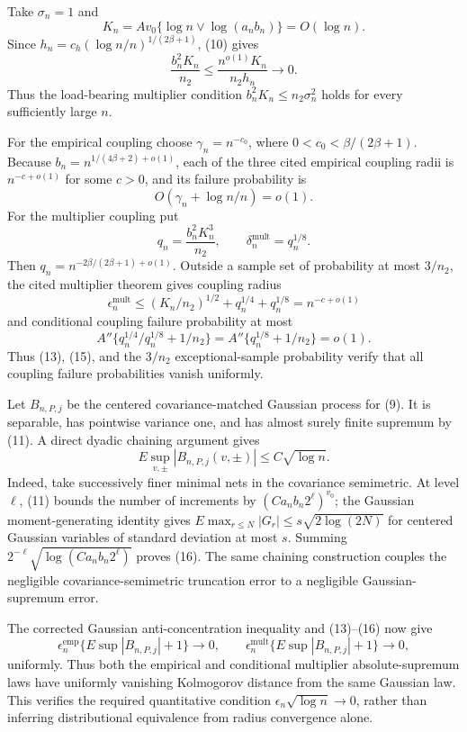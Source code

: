 Take \(\sigma_n=1\) and
\[
 K_n=Av_0\{\log n\vee\log(a_nb_n)\}=O(\log n).
\]
Since \(h_n=c_h(\log n/n)^{1/(2\beta+1)}\), (10) gives
\[
 \frac{b_n^2K_n}{n_2}
 \le\frac{n^{o(1)}K_n}{n_2h_n}\longrightarrow0. \tag{12}
\]
Thus the load-bearing multiplier condition \(b_n^2K_n\le n_2\sigma_n^2\) holds for every sufficiently large \(n\).

For the empirical coupling choose \(\gamma_n=n^{-c_0}\), where
\(0<c_0<\beta/(2\beta+1)\).  Because
\(b_n=n^{1/(4\beta+2)+o(1)}\), each of the three cited empirical coupling radii is \(n^{-c+o(1)}\) for some \(c>0\), and its failure probability is
\[
 O(\gamma_n+\log n/n)=o(1). \tag{13}
\]
For the multiplier coupling put
\[
 q_n=\frac{b_n^2K_n^3}{n_2},
 \qquad \delta_n^{\mathrm{mult}}=q_n^{1/8}.
\]
Then \(q_n=n^{-2\beta/(2\beta+1)+o(1)}\).  Outside a sample set of probability at most \(3/n_2\), the cited multiplier theorem gives coupling radius
\[
 \epsilon_n^{\mathrm{mult}}
 \le (K_n/n_2)^{1/2}+q_n^{1/4}+q_n^{1/8}
 =n^{-c+o(1)} \tag{14}
\]
and conditional coupling failure probability at most
\[
 A''\{q_n^{1/4}/q_n^{1/8}+1/n_2\}
 =A''\{q_n^{1/8}+1/n_2\}=o(1). \tag{15}
\]
Thus (13), (15), and the \(3/n_2\) exceptional-sample probability verify that all coupling failure probabilities vanish uniformly.

Let \(B_{n,P,j}\) be the centered covariance-matched Gaussian process for (9).  It is separable, has pointwise variance one, and has almost surely finite supremum by (11).  A direct dyadic chaining argument gives
\[
 E\sup_{v,\pm}|B_{n,P,j}(v,\pm)|\le C\sqrt{\log n}. \tag{16}
\]
Indeed, take successively finer minimal nets in the covariance semimetric.  At level \(\ell\), (11) bounds the number of increments by \((Ca_nb_n2^\ell)^{v_0}\); the Gaussian moment-generating identity gives
\(E\max_{r\le N}|G_r|\le s\sqrt{2\log(2N)}\) for centered Gaussian variables of standard deviation at most \(s\).  Summing
\(2^{-\ell}\sqrt{\log(Ca_nb_n2^\ell)}\) proves (16).  The same chaining construction couples the negligible covariance-semimetric truncation error to a negligible Gaussian-supremum error.

The corrected Gaussian anti-concentration inequality and (13)--(16) now give
\[
 \epsilon_n^{\mathrm{emp}}\{E\sup|B_{n,P,j}|+1\}\to0,
 \qquad
 \epsilon_n^{\mathrm{mult}}\{E\sup|B_{n,P,j}|+1\}\to0, \tag{17}
\]
uniformly.  Thus both the empirical and conditional multiplier absolute-supremum laws have uniformly vanishing Kolmogorov distance from the same Gaussian law.  This verifies the required quantitative condition \(\epsilon_n\sqrt{\log n}\to0\), rather than inferring distributional equivalence from radius convergence alone.

